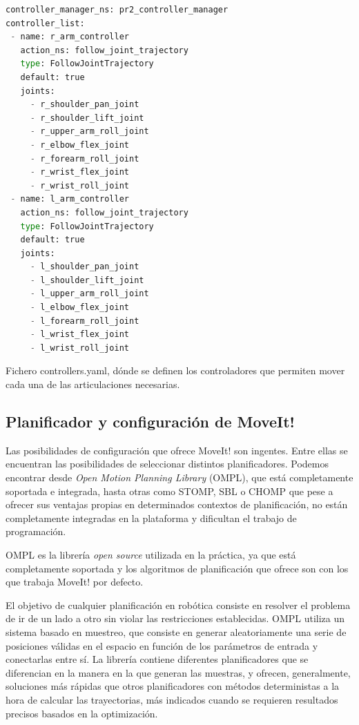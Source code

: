 \documentclass[12pt,spanish,chapterprefix, numbers=noenddot]{book}
\numberwithin{equation}{section}
\numberwithin{figure}{section}
\begin{document}
\begin{algorithm}[htb!]
	\begin{lstlisting}[breaklines=true,language=python] 
controller_manager_ns: pr2_controller_manager
controller_list:
 - name: r_arm_controller
   action_ns: follow_joint_trajectory
   type: FollowJointTrajectory
   default: true
   joints:
     - r_shoulder_pan_joint
     - r_shoulder_lift_joint
     - r_upper_arm_roll_joint
     - r_elbow_flex_joint
     - r_forearm_roll_joint
     - r_wrist_flex_joint
     - r_wrist_roll_joint
 - name: l_arm_controller
   action_ns: follow_joint_trajectory
   type: FollowJointTrajectory
   default: true
   joints:
     - l_shoulder_pan_joint
     - l_shoulder_lift_joint
     - l_upper_arm_roll_joint
     - l_elbow_flex_joint
     - l_forearm_roll_joint
     - l_wrist_flex_joint
     - l_wrist_roll_joint
	\end{lstlisting}
\caption{\label{alg:pr2_controllers}Fichero controllers.yaml, dónde se definen los controladores que permiten mover cada una de las articulaciones necesarias.}
\end{algorithm}

\subsection{Planificador y configuración de MoveIt!}
Las posibilidades de configuración que ofrece MoveIt! son ingentes. Entre ellas se encuentran las posibilidades de seleccionar distintos planificadores. Podemos encontrar desde \textit{Open Motion Planning Library} (OMPL), que está completamente soportada e integrada, hasta otras como STOMP, SBL o CHOMP que pese a ofrecer sus ventajas propias en determinados contextos de planificación, no están completamente integradas en la plataforma y dificultan el trabajo de programación. 

OMPL es la librería \textit{open source} utilizada en la práctica, ya que está completamente soportada y los algoritmos de planificación que ofrece son con los que trabaja MoveIt! por defecto. \cite{moveit_planners}

El objetivo de cualquier planificación en robótica consiste en resolver el problema de ir de un lado a otro sin violar las restricciones establecidas. OMPL utiliza un sistema basado en muestreo, que consiste en generar aleatoriamente una serie de posiciones válidas en el espacio en función de los parámetros de entrada y conectarlas entre sí.
\newpage
La librería contiene diferentes planificadores que se diferencian en la manera en la que generan las muestras, y ofrecen, generalmente, soluciones más rápidas que otros planificadores con métodos deterministas  a la hora de calcular las trayectorias, más indicados cuando se requieren resultados precisos basados en la optimización.
\end{document}
